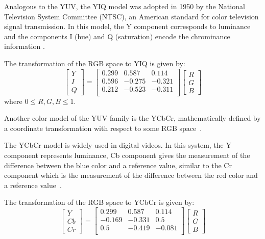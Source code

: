 Analogous to the YUV, the YIQ model was adopted in 1950 by the National Television System Committee (NTSC), an American standard for color television signal transmission. In this model, the Y component corresponds to luminance and the components I (hue) and Q (saturation) encode the chrominance information \citep{pedrini:08}.

The transformation of the RGB space to YIQ is given by:\\
\begin{equation}
  \begin{bmatrix}
    Y \\ I \\ Q
  \end{bmatrix} = 
  \begin{bmatrix}
    0.299  &  0.587 &  0.114 \\
    0.596  & -0.275 & -0.321 \\
    0.212  & -0.523 & -0.311 \\
  \end{bmatrix}
  \begin{bmatrix}
    R \\ G \\ B
  \end{bmatrix}
\end{equation}
where $0 \leq R, G, B \leq 1$.

Another color model of the YUV family is the YCbCr, mathematically defined by a coordinate transformation with respect to some RGB space~\citep{pedrini:08}.

The YCbCr model is widely used in digital videos. In this system, the Y component represents luminance, Cb component gives the measurement of the difference between the blue color and a reference value, similar to the Cr component which is the measurement of the difference between the red color and a reference value~\citep{pedrini:08}.

The transformation of the RGB space to YCbCr is given by:\\
\begin{equation}
  \begin{bmatrix}
    Y \\ Cb \\ Cr
  \end{bmatrix} = 
  \begin{bmatrix}
     0.299 &  0.587 &  0.114 \\
    -0.169 & -0.331 &  0.5   \\
     0.5   & -0.419 & -0.081 \\
  \end{bmatrix}
  \begin{bmatrix}
    R \\ G \\ B
  \end{bmatrix}
\end{equation}


